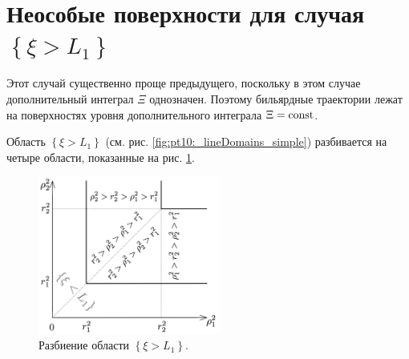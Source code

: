\section{Неособые поверхности для случая $\left\{\xi > L_1\right\}$}\label{sec:ch5/sec7}
Этот случай существенно проще предыдущего, поскольку в этом случае дополнительный интеграл $\Xi$ однозначен. Поэтому бильярдные траектории лежат на поверхностях уровня дополнительного интеграла $\Xi=\mathrm{const}$.

Область $\left\{\xi > L_1 \right\}$ (см. рис. \ref{fig:pt10:_lineDomains_simple}) разбивается  на четыре области, показанные на рис. \ref{fig:pt10:_xiL1_subdivision}.
\begin{figure}[!htb]
\centering
\includegraphics[width=6cm]{images/ch4/section3_circular/sect3_xiL1_subdivision.pdf}
    \caption{Разбиение области $\left\{\xi > L_1\right\}$.}
    \label{fig:pt10:_xiL1_subdivision}
\end{figure}


